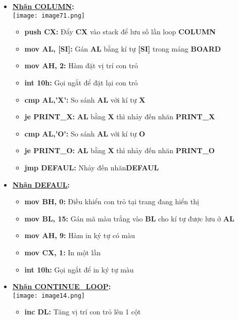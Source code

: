 \begin{itemize}
    \item \textbf{\underline{Nhãn COLUMN}: }\\
    \texttt{[image: image71.png]}
    \begin{itemize}
        \item \textbf{push CX:} Đẩy \textbf{CX} vào stack để lưu số lần loop \textbf{COLUMN}
        \item \textbf{mov AL, [SI]:} Gán \textbf{AL} bằng kí tự \textbf{[SI]} trong mảng \textbf{BOARD}
        \item \textbf{mov AH, 2:} Hàm đặt vị trí con trỏ
        \item \textbf{int 10h:} Gọi ngắt để đặt lại con trỏ
        \item \textbf{cmp AL,’X’:} So sánh \textbf{AL} với kí tự \textbf{X}
        \item \textbf{je PRINT\_X:} \textbf{AL} bằng \textbf{X} thì nhảy đến nhăn \textbf{PRINT\_X}
        \item \textbf{cmp AL,’O’:} So sánh \textbf{AL} với kí tự \textbf{O}
        \item \textbf{je PRINT\_O:} \textbf{AL} bằng \textbf{X} thì nhảy đến nhăn \textbf{PRINT\_O}
        \item \textbf{jmp DEFAUL:} Nhảy đến nhãn\textbf{DEFAUL}
    \end{itemize}
    \item \textbf{\underline{Nhãn DEFAUL}: }
    \begin{itemize}
        \item \textbf{mov BH, 0:} Điều khiển con trỏ tại trang đang hiển thị 
        \item \textbf{mov BL, 15:} Gán mã màu trắng vào \textbf{BL} cho kí tự được lưu ở \textbf{AL}
        \item \textbf{mov AH, 9:} Hàm in ký tự có màu
        \item \textbf{mov CX, 1:} In một lần 
        \item \textbf{int 10h:} Gọi ngắt để in ký tự màu
    \end{itemize}
    \item \textbf{\underline{Nhãn CONTINUE\_LOOP}: }\\
    \texttt{[image: image14.png]}
    \begin{itemize}
        \item \textbf{inc DL:} Tăng vị trí con trỏ lên 1 cột

\end{itemize}
\end{itemize}
